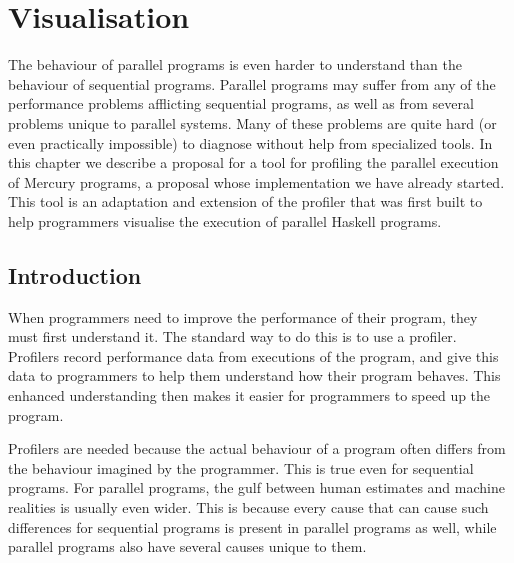 
\chapter{Visualisation}
\label{chap:tscope}


The behaviour of parallel programs is even harder to understand
than the behaviour of sequential programs.
Parallel programs may suffer from
any of the performance problems afflicting sequential programs,
as well as from several problems unique to parallel systems.
Many of these problems are quite hard
(or even practically impossible)
to diagnose without help from specialized tools.
In this chapter we describe a proposal for a tool
for profiling the parallel execution of Mercury programs,
a proposal whose implementation we have already started.
This tool is an adaptation and extension of the \tscope profiler
that was first built to help programmers visualise
the execution of parallel Haskell programs.

\section{Introduction}

When programmers need to improve the performance of their program,
they must first understand it.
The standard way to do this is to use a profiler.
Profilers record performance data from executions of the program,
and give this data to programmers
to help them understand how their program behaves.
This enhanced understanding then makes it easier
for programmers to speed up the program.

Profilers are needed because the actual behaviour of a program
often differs from the behaviour imagined by the programmer.
This is true even for sequential programs.
For parallel programs,
the gulf between human estimates and machine realities
is usually even wider.
This is because every cause
that can cause such differences for sequential programs
is present in parallel programs as well,
while parallel programs also have several causes unique to them.

